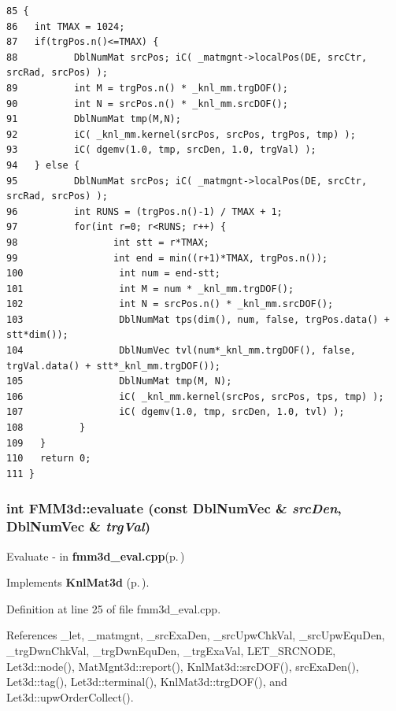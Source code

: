\footnotesize\begin{verbatim}85 {
86   int TMAX = 1024;
87   if(trgPos.n()<=TMAX) {
88          DblNumMat srcPos; iC( _matmgnt->localPos(DE, srcCtr, srcRad, srcPos) );
89          int M = trgPos.n() * _knl_mm.trgDOF();
90          int N = srcPos.n() * _knl_mm.srcDOF();
91          DblNumMat tmp(M,N);
92          iC( _knl_mm.kernel(srcPos, srcPos, trgPos, tmp) );
93          iC( dgemv(1.0, tmp, srcDen, 1.0, trgVal) );
94   } else {
95          DblNumMat srcPos; iC( _matmgnt->localPos(DE, srcCtr, srcRad, srcPos) );
96          int RUNS = (trgPos.n()-1) / TMAX + 1;
97          for(int r=0; r<RUNS; r++) {
98                 int stt = r*TMAX;
99                 int end = min((r+1)*TMAX, trgPos.n());
100                 int num = end-stt;
101                 int M = num * _knl_mm.trgDOF();
102                 int N = srcPos.n() * _knl_mm.srcDOF();
103                 DblNumMat tps(dim(), num, false, trgPos.data() + stt*dim());
104                 DblNumVec tvl(num*_knl_mm.trgDOF(), false, trgVal.data() + stt*_knl_mm.trgDOF());
105                 DblNumMat tmp(M, N);
106                 iC( _knl_mm.kernel(srcPos, srcPos, tps, tmp) );
107                 iC( dgemv(1.0, tmp, srcDen, 1.0, tvl) );
108          }
109   }
110   return 0;
111 }
\end{verbatim}\normalsize 


\subsubsection{\setlength{\rightskip}{0pt plus 5cm}int FMM3d::evaluate (const Dbl\-Num\-Vec \& {\em src\-Den}, Dbl\-Num\-Vec \& {\em trg\-Val})\hspace{0.3cm}{\tt  [virtual]}}\label{classFMM3d_3d2ce8cfb3d9632d6b69352f1bb5eda2_3d2ce8cfb3d9632d6b69352f1bb5eda2}


Evaluate - in {\bf fmm3d\_\-eval.cpp}{\rm (p.\,\pageref{fmm3d__eval_8cpp})} 

Implements {\bf Knl\-Mat3d} {\rm (p.\,\pageref{classKnlMat3d_fcf3de1e6ce4ee024ef0d320363bd920_fcf3de1e6ce4ee024ef0d320363bd920})}.

Definition at line 25 of file fmm3d\_\-eval.cpp.

References \_\-let, \_\-matmgnt, \_\-src\-Exa\-Den, \_\-src\-Upw\-Chk\-Val, \_\-src\-Upw\-Equ\-Den, \_\-trg\-Dwn\-Chk\-Val, \_\-trg\-Dwn\-Equ\-Den, \_\-trg\-Exa\-Val, LET\_\-SRCNODE, Let3d::node(), Mat\-Mgnt3d::report(), Knl\-Mat3d::src\-DOF(), src\-Exa\-Den(), Let3d::tag(), Let3d::terminal(), Knl\-Mat3d::trg\-DOF(), and Let3d::upw\-Order\-Collect().

